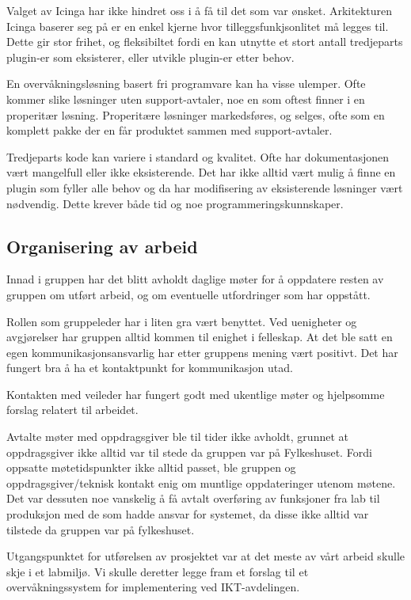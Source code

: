 Valget av Icinga har ikke hindret oss i å få til det som var ønsket. Arkitekturen Icinga baserer seg på er en enkel kjerne hvor tilleggsfunkjsonlitet må legges til. Dette gir stor frihet, og fleksibiltet fordi en kan utnytte et stort antall tredjeparts plugin-er som eksisterer, eller utvikle plugin-er etter behov. 

En overvåkningsløsning basert fri programvare kan ha visse ulemper. Ofte kommer slike løsninger uten support-avtaler, noe en som oftest finner i en properitær løsning. Properitære løsninger markedsføres, og selges, ofte som en komplett pakke der en får produktet sammen med support-avtaler. 

Tredjeparts kode kan variere i standard og kvalitet. Ofte har dokumentasjonen vært mangelfull eller ikke eksisterende. Det har ikke alltid vært mulig å finne en plugin som fyller alle behov og da har modifisering av eksisterende løsninger vært nødvendig. Dette krever både tid og noe programmeringskunnskaper.

\subsection{Organisering av arbeid}
Innad i gruppen har det blitt avholdt daglige møter for å oppdatere resten av gruppen om utført arbeid, og om eventuelle utfordringer som har oppstått. 

Rollen som gruppeleder har i liten gra vært benyttet. Ved uenigheter og avgjørelser har gruppen alltid kommen til enighet i felleskap. At det ble satt en egen kommunikasjonsansvarlig har etter gruppens mening vært positivt. Det har fungert bra å ha et kontaktpunkt for kommunikasjon utad.

Kontakten med veileder har fungert godt med ukentlige møter og hjelpsomme forslag relatert til arbeidet.

Avtalte møter med oppdragsgiver ble til tider ikke avholdt, grunnet at oppdragsgiver ikke alltid var til stede da gruppen var på Fylkeshuset. Fordi oppsatte møtetidspunkter ikke alltid passet, ble gruppen og oppdragsgiver/teknisk kontakt enig om muntlige oppdateringer utenom møtene. Det var dessuten noe vanskelig å få avtalt overføring av funksjoner fra lab til produksjon med de som hadde ansvar for systemet, da disse ikke alltid var tilstede da gruppen var på fylkeshuset. 

Utgangspunktet for utførelsen av prosjektet var at det meste av vårt arbeid skulle skje i et labmiljø. Vi skulle deretter legge fram et forslag til et overvåkningssystem for implementering ved IKT-avdelingen.

